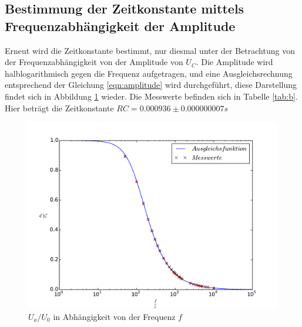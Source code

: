 \subsection{Bestimmung der Zeitkonstante mittels Frequenzabhängigkeit der Amplitude }
Erneut wird die Zeitkonstante bestimmt, nur diesmal unter
der Betrachtung von der Frequenzabhängigkeit von der Amplitude von $U_C$.
Die Amplitude wird halblogarithmisch gegen die Frequenz aufgetragen, und eine Ausgleichsrechnung
entsprechend der Gleichung \eqref{eqn:amplitude} wird durchgeführt,
diese Darstellung findet sich in Abbildung \ref{abb:b} wieder.
Die Messwerte befinden sich in Tabelle \ref{tab:b}.
Hier beträgt die Zeitkonstante $RC=0.000936 \pm 0.000000007s$
\begin{figure}[h]
  \centering
  \includegraphics[width=1\textwidth]{b.pdf}
  \caption{$U_a/U_0$ in Abhängigkeit von der Frequenz $f$}
  \label{abb:b}
\end{figure}

